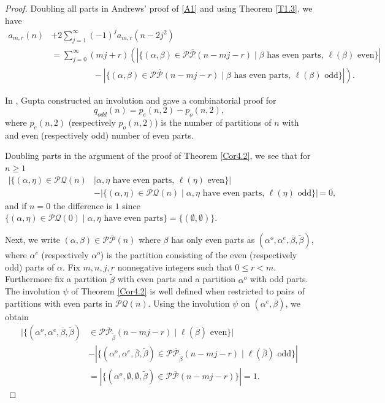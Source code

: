 \documentclass{amsart}
\theoremstyle{definition}
\begin{document}
\begin{proof}Doubling all parts in Andrews' proof of \eqref{A1} and using Theorem \ref{T1.3}, we have  \begin{align*}a_{m,r}(n)&+2\sum_{j=1}^\infty (-1)^j a_{m,r}(n-2j^2)\\ & =\sum_{j=0}^\infty (mj+r)\left(|\{(\alpha, \beta)\in  \mathcal P \overline{\mathcal P}(n-mj-r) \mid \beta \text{ has even parts, } \ell(\beta) \text{ even}\}|\right.\\  &\qquad \qquad\ \ \ \  -\left. |\{(\alpha, \beta)\in  \mathcal P \overline{\mathcal P}(n-mj-r) \mid \beta \text{ has even parts, } \ell(\beta)  \text{ odd}\}|\right).\end{align*} 

In \cite{G75}, Gupta constructed an involution and gave a combinatorial proof for $$q_{odd}(n)=p_e(n,2)-p_o(n,2),$$ where $p_e(n,2)$ (respectively $p_o(n,2)$) is the number of partitions of $n$ with and even (respectively odd) number of even parts. 

Doubling parts in the argument of the proof of Theorem \ref{Cor4.2}, we see that for $n\geq 1$ \begin{align*}|\{(\alpha, \eta) \in \mathcal{PQ}(n)& \mid  \alpha, \eta \text{ have even parts, }\ell(\eta) \text{ even}\}|\\ & -|\{(\alpha, \eta) \in \mathcal{PQ}(n)\mid \alpha, \eta \text{ have even parts, } \ell(\eta) \text{ odd}\}|=0,\end{align*} and if $n=0$ the difference is $1$ since $\{(\alpha, \eta) \in \mathcal{PQ}(0)\mid \alpha, \eta \text{ have even parts}\}= \{(\emptyset, \emptyset)\}.$

Next, we write $(\alpha, \beta)\in \mathcal P \overline{\mathcal P}(n)$ where $\beta$ has only even parts as $(\alpha^o, \alpha^e, \overline \beta, \widetilde \beta)$, where $\alpha^e$ (respectively $\alpha^o$) is the partition consisting of the even (respectively odd) parts of $\alpha$. Fix $m, n, j, r $ nonnegative integers  such that $0\leq r<m$. 
Furthermore fix a partition $\widetilde \beta$ with even parts and a partition $\alpha^o$ with odd parts.  The involution $\psi$ of Theorem \ref{Cor4.2} is well defined when restricted to pairs of partitions with even parts in $\mathcal{PQ}(n)$.
Using the involution $\psi$ on $(\alpha^e, \overline \beta)$, we obtain \begin{align*}|\{(\alpha^o, \alpha^e, \overline \beta,\widetilde \beta) & \in \mathcal P \overline{\mathcal P}_{\widetilde \beta}(n-mj-r)\mid \ell(\overline \beta) \text{ even}\}|\\&  -|\{(\alpha^o, \alpha^e, \overline \beta,\widetilde \beta) \in \mathcal P \overline{\mathcal P}_{\widetilde \beta}(n-mj-r)\mid \ell(\overline \beta) \text{ odd}\}|\\ & = |\{( \alpha^o,\emptyset, \emptyset,\widetilde \beta) \in \mathcal P \overline{\mathcal P}(n-mj-r)\}|=1.\end{align*}


\end{proof}
\end{document}
